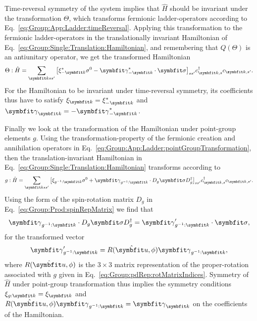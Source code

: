 Time-reversal symmetry of the system implies that $\hat{H}$ should be invariant under the transformation $\Theta$, which transforms fermionic ladder-operators
according to Eq.~\eqref{eq:Group:App:Ladder:timeReversal}. Applying this transformation to the fermionic ladder-operators in the translationally invariant Hamiltonian of
Eq.~\eqref{eq:Group:Single:Translation:Hamiltonian}, and remembering that $Q(\Theta)$ is an antiunitary operator, we get the transformed Hamiltonian
\begin{equation}
    \label{eq:Group:Single:TRS:transformedHamiltonian}
    \Theta:\hat{H} = \sum_{\v{k}ss'}\big[\xi_{-\v{k}}^\ast\sigma^0 - \v{\gamma}_{-\v{k}}^\ast\cdot\v{\sigma}\big]_{ss'}c^\dagger_{\v{k},s}c_{\v{k},s'}.
\end{equation}
For the Hamiltonian to be invariant under time-reversal symmetry, its coefficients thus have to satisfy $\xi_\v{k} = \xi_{-\v{k}}^\ast$ and
$\v{\gamma}_\v{k} = -\v{\gamma}_{-\v{k}}^\ast$.

Finally we look at the transformation of the Hamiltonian under point-group elements $g$. Using the transformation-property of the fermionic creation and
annihilation operators in Eq.~\eqref{eq:Group:App:Ladder:pointGroupTransformation}, then the translation-invariant Hamiltonian in
Eq.~\eqref{eq:Group:Single:Translation:Hamiltonian} transforms according to
\begin{equation}
    \label{eq:Group:Single:Point:transformedHamiltonian}
    g:\hat{H} = \sum_{\v{k}ss'}\big[\xi_{g^{-1}:\v{k}}\sigma^0 + \v{\gamma}_{g^{-1}:\v{k}}\cdot D_g\v{\sigma}D_g^\dagger\big]_{ss'}c^\dagger_{\v{k},s}c_{\v{k},s'}.
\end{equation}
Using the form of the spin-rotation matrix $D_g$ in Eq.~\eqref{eq:Group:Prod:spinRepMatrix} we find that
\begin{equation}
    \label{eq:Group:Single:Point:sigmaTransform}
    \v{\gamma}_{g^{-1}:\v{k}}\cdot D_g\v{\sigma}D_g^\dagger = \v{\gamma}'_{g^{-1}:\v{k}}\cdot\v{\sigma},
\end{equation}
for the transformed vector
\begin{equation}
    \label{eq:Group:Single:point:transformedVector}
    \v{\gamma}'_{g^{-1}:\v{k}} = R(\hat{\v{u}},\phi)\v{\gamma}_{g^{-1}:\v{k}},
\end{equation}
where $R(\hat{\v{u}},\phi)$ is the $3\times3$ matrix representation of the proper-rotation associated with $g$ given in
Eq.~\eqref{eq:Group:pdRep:rotMatrixIndices}. Symmetry of $\hat{H}$ under point-group transformation thus implies the symmetry conditions $\xi_{g:\v{k}} = \xi_{\v{k}}$
and $R(\hat{\v{u}},\phi)\v{\gamma}_{g^{-1}:\v{k}} = \v{\gamma}_\v{k}$ on the coefficients of the Hamiltonian.


